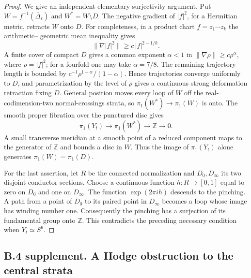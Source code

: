 \begin{proof}
We give an independent elementary
surjectivity argument. Put
$W=f^{-1}(\overline\Delta_\epsilon)$
and $W^*=W\setminus D$. The negative
gradient of $|f|^2$, for a Hermitian
metric, retracts $W$ onto $D$.
For completeness, in a product chart
$f=z_1\cdots z_k$ the arithmetic--
geometric mean inequality gives
\[
 \|\nabla |f|^2\|
   \ge c\,|f|^{2-1/k}.
\]
A finite cover of compact $D$ gives
a common exponent $\alpha<1$ in
$\|\nabla\rho\|\ge c\rho^\alpha$,
where $\rho=|f|^2$; for a fourfold
one may take $\alpha=7/8$.
The remaining trajectory length is
bounded by
$c^{-1}\rho^{1-\alpha}/(1-\alpha)$.
Hence trajectories converge uniformly
to $D$, and parametrization by the
level of $\rho$ gives a continuous
strong deformation retraction fixing
$D$. General position moves every
loop of $W$ off the real-codimension-two
normal-crossings strata, so
$\pi_1(W^*)\to\pi_1(W)$ is onto.
The smooth proper fibration over the
punctured disc gives
\[
 \pi_1(Y_t)\longrightarrow\pi_1(W^*)
       \longrightarrow\mathbb Z\longrightarrow0.
\]
A small transverse meridian at a
smooth point of a reduced component
maps to the generator of $\mathbb Z$
and bounds a disc in $W$.
Thus the image of $\pi_1(Y_t)$ alone
generates $\pi_1(W)=\pi_1(D)$.

For the last assertion, let $R$ be
the connected normalization and
$D_0,D_\infty$ its two disjoint
conductor sections. Choose a
continuous function $h:R\to[0,1]$
equal to zero on $D_0$ and one on
$D_\infty$. The function
$\exp(2\pi i h)$ descends to the
pinching. A path from a point of
$D_0$ to its paired point in
$D_\infty$ becomes a loop whose
image has winding number one.
Consequently the pinching has a
surjection of its fundamental group
onto $\mathbb Z$. This contradicts
the preceding necessary condition
when $Y_t\simeq S^6$.
\end{proof}

\subsection{B.4 supplement. A Hodge obstruction to the central strata}

